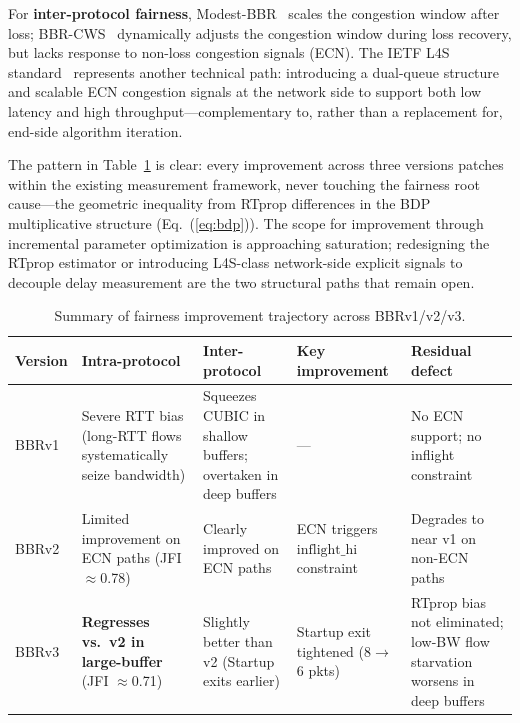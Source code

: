 \documentclass[a4paper,fleqn]{cas-sc}
\begin{document}
For \textbf{inter-protocol fairness}, Modest-BBR~\citep{zhang2018modest} scales
the congestion window after loss; BBR-CWS~\citep{song2020bbrcws} dynamically
adjusts the congestion window during loss recovery, but lacks response to
non-loss congestion signals (ECN). The IETF L4S standard~\citep{rfc9330}
represents another technical path: introducing a dual-queue structure and scalable
ECN congestion signals at the network side to support both low latency and high
throughput---complementary to, rather than a replacement for, end-side algorithm
iteration.

The pattern in Table~\ref{tab:fairness_versions} is clear: every improvement
across three versions patches within the existing measurement framework, never
touching the fairness root cause---the geometric inequality from RTprop differences
in the BDP multiplicative structure (Eq.~(\ref{eq:bdp})). The scope for
improvement through incremental parameter optimization is approaching saturation;
redesigning the RTprop estimator or introducing L4S-class network-side explicit
signals to decouple delay measurement are the two structural paths that remain open.

\begin{table}[pos=htbp]
  \caption{Summary of fairness improvement trajectory across BBRv1/v2/v3.}
  \label{tab:fairness_versions}
  \small
  \begin{tabularx}{\tblwidth}{@{}p{1.0cm}p{2.3cm}p{2.3cm}p{2.0cm}X@{}}
    \toprule
    \textbf{Version} & \textbf{Intra-protocol} & \textbf{Inter-protocol}
      & \textbf{Key improvement} & \textbf{Residual defect} \\
    \midrule
    BBRv1 & Severe RTT bias (long-RTT flows systematically seize bandwidth) &
      Squeezes CUBIC in shallow buffers; overtaken in deep buffers & --- &
      No ECN support; no inflight constraint \\
    \midrule
    BBRv2 & Limited improvement on ECN paths (JFI $\approx$0.78) &
      Clearly improved on ECN paths &
      ECN triggers $\mathrm{inflight\_hi}$ constraint &
      Degrades to near v1 on non-ECN paths \\
    \midrule
    BBRv3 & \textbf{Regresses vs.\ v2 in large-buffer} (JFI $\approx$0.71) &
      Slightly better than v2 (Startup exits earlier) &
      Startup exit tightened (8$\to$6 pkts) &
      RTprop bias not eliminated; low-BW flow starvation worsens in deep buffers \\
    \bottomrule
  \end{tabularx}
\end{table}
\end{document}
